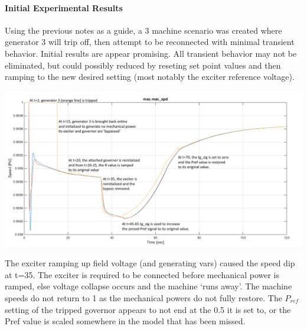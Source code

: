 \documentclass[12pt]{article}
\begin{document}
\pagebreak
\begin{landscape}

\paragraph{Initial Experimental Results}
Using the previous notes as a guide, a 3 machine scenario was created where generator 3 will trip off, then attempt to be reconnected with minimal transient behavior.
Initial results are appear promising.
All transient behavior may not be eliminated, but could possibly reduced by reseting set point values and then ramping to the new desired setting (most notably the exciter reference voltage).
\begin{center}
\includegraphics[width=.95\linewidth]{machineSpeedsNotes}
\end{center}

The exciter ramping up field voltage (and generating vars) caused the speed dip at t=35.
The exciter is required to be connected before mechanical power is ramped, else voltage collapse occurs and the machine `runs away'.
The machine speeds do not return to 1 as the mechanical powers do not fully restore.
The $P_{ref}$ setting of the tripped governor appears to not end at the 0.5 it is set to, or the Pref value is scaled somewhere in the model that has been missed.
\end{landscape}
\end{document}
